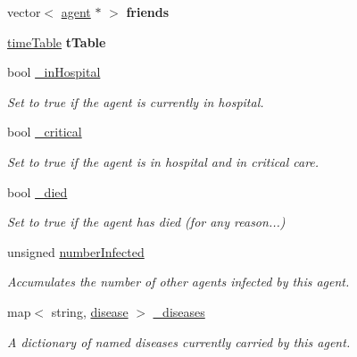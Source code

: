\begin{DoxyCompactItemize}
\mbox{\label{classagent_a6235c5897c39008af08d75fa7dca13b2}} 
vector$<$ \mbox{\hyperlink{classagent}{agent}} $\ast$ $>$ {\bfseries friends}
\item 
\mbox{\label{classagent_a0a669d47bb2f6781ea5ec1f2cdfdd4e2}} 
\mbox{\hyperlink{structtimeTable}{time\+Table}} {\bfseries t\+Table}
\item 
\mbox{\label{classagent_a4a2f231b103bbe13452570921e296ea1}} 
bool \mbox{\hyperlink{classagent_a4a2f231b103bbe13452570921e296ea1}{\+\_\+in\+Hospital}}
\begin{DoxyCompactList}\small\item\em Set to true if the agent is currently in hospital. \end{DoxyCompactList}\item 
\mbox{\label{classagent_a9803ed96415b37e5ad091848a53e1944}} 
bool \mbox{\hyperlink{classagent_a9803ed96415b37e5ad091848a53e1944}{\+\_\+critical}}
\begin{DoxyCompactList}\small\item\em Set to true if the agent is in hospital and in critical care. \end{DoxyCompactList}\item 
\mbox{\label{classagent_a0d09f2c676410b866a348291900ee520}} 
bool \mbox{\hyperlink{classagent_a0d09f2c676410b866a348291900ee520}{\+\_\+died}}
\begin{DoxyCompactList}\small\item\em Set to true if the agent has died (for any reason...) \end{DoxyCompactList}\item 
unsigned \mbox{\hyperlink{classagent_a4145c90d534f84deb22a93560809134c}{number\+Infected}}
\begin{DoxyCompactList}\small\item\em Accumulates the number of other agents infected by this agent. \end{DoxyCompactList}\item 
map$<$ string, \mbox{\hyperlink{classdisease}{disease}} $>$ \mbox{\hyperlink{classagent_a2352342e95bc77041c07c0dafdfb7cd2}{\+\_\+diseases}}
\begin{DoxyCompactList}\small\item\em A dictionary of named diseases currently carried by this agent. \end{DoxyCompactList}\item 

\end{DoxyCompactItemize}
